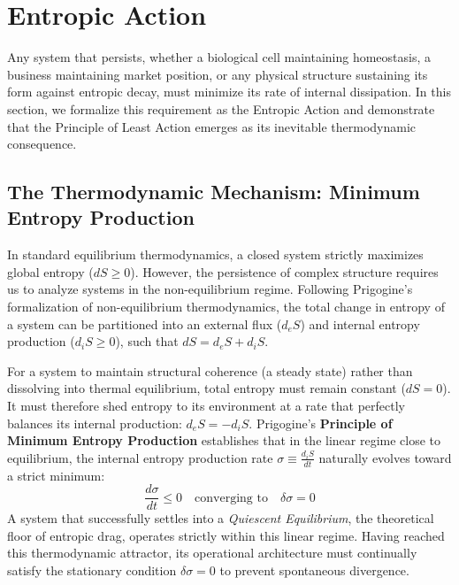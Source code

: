 \section{Entropic Action}
\label{sec:entropic_action}

Any system that persists, whether a biological cell maintaining homeostasis, a business maintaining market position, or any physical structure sustaining its form against entropic decay, must minimize its rate of internal dissipation. In this section, we formalize this requirement as the Entropic Action and demonstrate that the Principle of Least Action emerges as its inevitable thermodynamic consequence.

\subsection{The Thermodynamic Mechanism: Minimum Entropy Production}
In standard equilibrium thermodynamics, a closed system strictly maximizes global entropy ($dS \ge 0$). However, the persistence of complex structure requires us to analyze systems in the non-equilibrium regime. Following Prigogine's formalization of non-equilibrium thermodynamics\cite{prigogine_introduction_1961}, the total change in entropy of a system can be partitioned into an external flux ($d_eS$) and internal entropy production ($d_iS \ge 0$), such that $dS = d_eS + d_iS$. 

For a system to maintain structural coherence (a steady state) rather than dissolving into thermal equilibrium, total entropy must remain constant ($dS = 0$). It must therefore shed entropy to its environment at a rate that perfectly balances its internal production: $d_eS = -d_iS$. Prigogine's \textbf{Principle of Minimum Entropy Production} establishes that in the linear regime close to equilibrium, the internal entropy production rate $\sigma \equiv \frac{d_iS}{dt}$ naturally evolves toward a strict minimum:
\begin{equation}
    \frac{d\sigma}{dt} \le 0 \quad \text{converging to} \quad \delta\sigma = 0
\end{equation}
A system that successfully settles into a \textit{Quiescent Equilibrium}, the theoretical floor of entropic drag, operates strictly within this linear regime. Having reached this thermodynamic attractor, its operational architecture must continually satisfy the stationary condition $\delta\sigma = 0$ to prevent spontaneous divergence.

